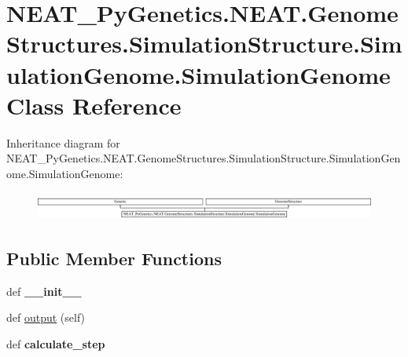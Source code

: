 \hypertarget{class_n_e_a_t___py_genetics_1_1_n_e_a_t_1_1_genome_structures_1_1_simulation_structure_1_1_simul922750a261fa1d0ca70a732923057496}{}\section{N\+E\+A\+T\+\_\+\+Py\+Genetics.\+N\+E\+A\+T.\+Genome\+Structures.\+Simulation\+Structure.\+Simulation\+Genome.\+Simulation\+Genome Class Reference}
\label{class_n_e_a_t___py_genetics_1_1_n_e_a_t_1_1_genome_structures_1_1_simulation_structure_1_1_simul922750a261fa1d0ca70a732923057496}
Inheritance diagram for N\+E\+A\+T\+\_\+\+Py\+Genetics.\+N\+E\+A\+T.\+Genome\+Structures.\+Simulation\+Structure.\+Simulation\+Genome.\+Simulation\+Genome\+:\begin{figure}[H]
\begin{center}
\leavevmode
\includegraphics[height=0.939597cm]{class_n_e_a_t___py_genetics_1_1_n_e_a_t_1_1_genome_structures_1_1_simulation_structure_1_1_simul922750a261fa1d0ca70a732923057496}
\end{center}
\end{figure}
\subsection*{Public Member Functions}
\begin{DoxyCompactItemize}
\item 
def {\bfseries \+\_\+\+\_\+init\+\_\+\+\_\+}\hypertarget{class_n_e_a_t___py_genetics_1_1_n_e_a_t_1_1_genome_structures_1_1_simulation_structure_1_1_simul922750a261fa1d0ca70a732923057496_a9e3d21a710e6b90ca8d6332fbdc8faa2}{}\label{class_n_e_a_t___py_genetics_1_1_n_e_a_t_1_1_genome_structures_1_1_simulation_structure_1_1_simul922750a261fa1d0ca70a732923057496_a9e3d21a710e6b90ca8d6332fbdc8faa2}

\item 
def \hyperlink{class_n_e_a_t___py_genetics_1_1_n_e_a_t_1_1_genome_structures_1_1_simulation_structure_1_1_simul922750a261fa1d0ca70a732923057496_af8bbfbec0e15a55d7a889ba9859f034a}{output} (self)
\item 
def {\bfseries calculate\+\_\+step}\hypertarget{class_n_e_a_t___py_genetics_1_1_n_e_a_t_1_1_genome_structures_1_1_simulation_structure_1_1_simul922750a261fa1d0ca70a732923057496_ae35fc2d42a8f79cf1cf7cf65b40910b6}{}\label{class_n_e_a_t___py_genetics_1_1_n_e_a_t_1_1_genome_structures_1_1_simulation_structure_1_1_simul922750a261fa1d0ca70a732923057496_ae35fc2d42a8f79cf1cf7cf65b40910b6}

\end{DoxyCompactItemize}
